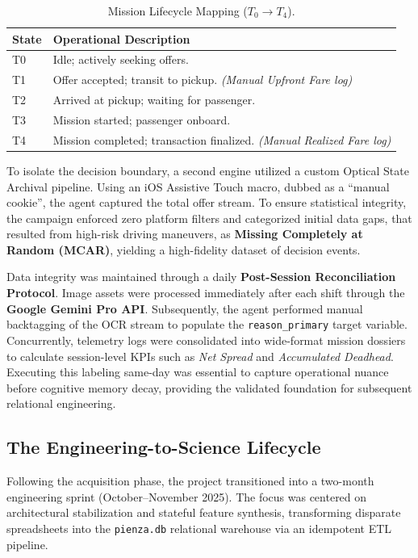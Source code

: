 \documentclass[10pt, letterpaper]{article}
\begin{document}
\begin{table}[H]
    \centering
    \small
    \begin{tabular}{l l}
        \toprule
        \textbf{State} & \textbf{Operational Description} \\
        \midrule
        T0 & Idle; actively seeking offers. \\ \addlinespace[2pt]
        T1 & Offer accepted; transit to pickup. \textit{(Manual Upfront Fare log)} \\ \addlinespace[2pt]
        T2 & Arrived at pickup; waiting for passenger. \\ \addlinespace[2pt]
        T3 & Mission started; passenger onboard. \\ \addlinespace[2pt]
        T4 & Mission completed; transaction finalized. \textit{(Manual Realized Fare log)} \\
        \bottomrule
    \end{tabular}
    \caption{Mission Lifecycle Mapping ($T_0 \to T_4$).}
    \label{tab:lifecycle}
\end{table}

To isolate the decision boundary, a second engine utilized a custom Optical State Archival pipeline. Using an iOS Assistive Touch macro, dubbed as a ``manual cookie'', the agent captured the total offer stream. To ensure statistical integrity, the campaign enforced zero platform filters and categorized initial data gaps, that resulted from high-risk driving maneuvers, as \textbf{Missing Completely at Random (MCAR)}, yielding a high-fidelity dataset of decision events.

Data integrity was maintained through a daily \textbf{Post-Session Reconciliation Protocol}. Image assets were processed immediately after each shift through the \textbf{Google Gemini Pro API}. Subsequently, the agent performed manual backtagging of the OCR stream to populate the \texttt{reason\_primary} target variable. Concurrently, telemetry logs were consolidated into wide-format mission dossiers to calculate session-level KPIs such as \textit{Net Spread} and \textit{Accumulated Deadhead}. Executing this labeling same-day was essential to capture operational nuance before cognitive memory decay, providing the validated foundation for subsequent relational engineering.



\subsection{The Engineering-to-Science Lifecycle}
Following the acquisition phase, the project transitioned into a two-month engineering sprint (October--November 2025). The focus was centered on architectural stabilization and stateful feature synthesis, transforming disparate spreadsheets into the \texttt{pienza.db} relational warehouse via an idempotent ETL pipeline. 
\end{document}
